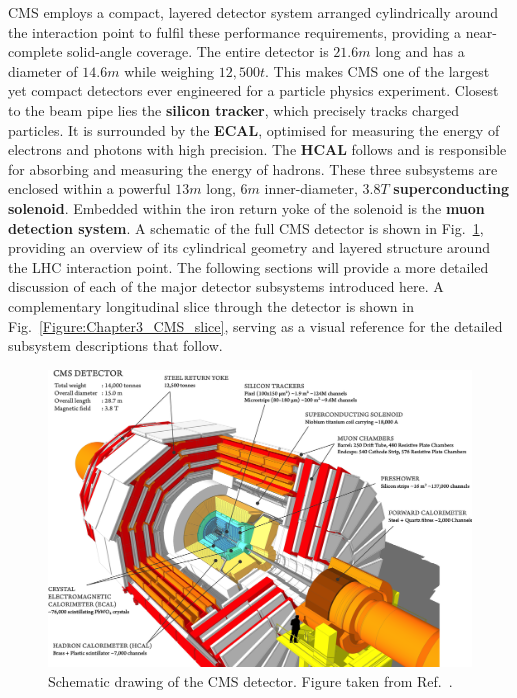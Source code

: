 CMS employs a compact, layered detector system arranged cylindrically around the interaction point to fulfil these performance requirements, providing a near-complete solid-angle coverage. The entire detector is $21.6\unit{m}$ long and has a diameter of $14.6\unit{m}$ while weighing $12,500\unit{t}$. This makes CMS one of the largest yet compact detectors ever engineered for a particle physics experiment. Closest to the beam pipe lies the \textbf{silicon tracker}, which precisely tracks charged particles. It is surrounded by the \textbf{\ac{ECAL}}, optimised for measuring the energy of electrons and photons with high precision. The \textbf{\ac{HCAL}} follows and is responsible for absorbing and measuring the energy of hadrons. These three subsystems are enclosed within a powerful $13\unit{m}$ long, $6\unit{m}$ inner-diameter, $3.8\unit{T}$ \textbf{superconducting solenoid}. Embedded within the iron return yoke of the solenoid is the \textbf{muon detection system}. A schematic of the full CMS detector is shown in Fig.~\ref{Figure:Chapter3_CMS_schematic}, providing an overview of its cylindrical geometry and layered structure around the LHC interaction point. The following sections will provide a more detailed discussion of each of the major detector subsystems introduced here. A complementary longitudinal slice through the detector is shown in Fig.~\ref{Figure:Chapter3_CMS_slice}, serving as a visual reference for the detailed subsystem descriptions that follow.

\begin{figure}[h]
\centering
\includegraphics[width= 1\textwidth]{Figures/Chapter3/CMS_Detector.png}
\caption{Schematic drawing of the CMS detector. Figure taken from Ref.~\cite{CMS_Detector_Run3}.}
\label{Figure:Chapter3_CMS_schematic}
\end{figure}

